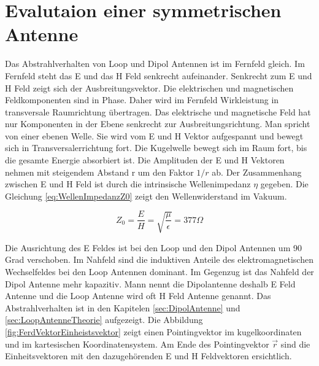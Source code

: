 \newpage
\section{Evalutaion einer symmetrischen Antenne}
Das Abstrahlverhalten von Loop und Dipol Antennen ist im Fernfeld gleich. Im Fernfeld steht das E und das
H Feld senkrecht aufeinander. Senkrecht zum E und H Feld zeigt sich der Ausbreitungsvektor. Die elektrischen und
magnetischen Feldkomponenten sind in Phase. Daher wird im Fernfeld Wirkleistung in transversale Raumrichtung
übertragen. Das elektrische und magnetische Feld hat nur Komponenten in der Ebene senkrecht zur Ausbreitungsrichtung.
Man spricht von einer ebenen Welle. Sie wird vom E und H Vektor aufgespannt  und bewegt sich in
Transversalerrichtung fort. Die Kugelwelle bewegt sich im Raum fort, bis die gesamte Energie absorbiert ist. Die Amplituden der E und H Vektoren
nehmen mit steigendem Abstand r um den Faktor $1/r$  ab. Der Zusammenhang zwischen E und H Feld ist
durch die intrinsische Wellenimpedanz $\eta$ gegeben. 
Die Gleichung \ref{eq:WellenImpedanzZ0} zeigt den Wellenwiderstand im Vakuum.

\begin{equation}\label{eq:WellenImpedanzZ0}
Z_{0}=\dfrac{E}{H}=\sqrt{\dfrac{\mu}{\epsilon}}=377\Omega
\end{equation}



Die Ausrichtung des E Feldes ist bei den Loop und den Dipol Antennen um 90 Grad verschoben. 
Im Nahfeld sind die induktiven Anteile des elektromagnetischen Wechselfeldes bei den Loop Antennen dominant. 
Im Gegenzug ist das Nahfeld der Dipol Antenne mehr kapazitiv.
Mann nennt die Dipolantenne deshalb E Feld Antenne und die Loop Antenne wird oft H Feld Antenne genannt.
Das Abstrahlverhalten ist in den Kapitelen \ref{sec:DipolAntenne} und \ref{sec:LoopAntenneTheorie} aufgezeigt. Die Abbildung \ref{fig:FerdVektorEinheistsvektor} zeigt einen Pointingvektor im  kugelkoordinaten und im kartesischen Koordinatensystem. Am Ende des Pointingvektor $\vec{r}$  sind die Einheitsvektoren mit den dazugehörenden  E und H Feldvektoren ersichtlich.\\

